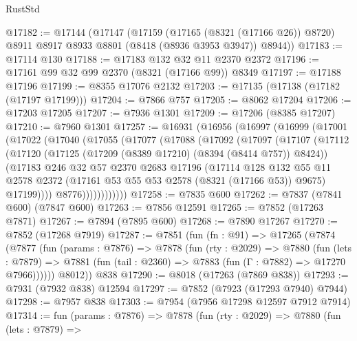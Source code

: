 \begin{lexlean}{RustStd}
\begin{coremodule}
@17182 := @17144
    (@17147
      (@17159
        (@17165 (@8321 (@17166 @26)) @8720)
        @8911
        @8917
        @8933
        @8801
        (@8418 (@8936 @3953 @3947))
        @8944))
@17183 := @17114 @130
@17188 := @17183 @132 @32 @11 @2370 @2372
@17196 := @17161 @99 @32 @99 @2370 (@8321 (@17166 @99)) @8349
@17197 := @17188 @17196
@17199 := @8355 @17076 @2132
@17203 := @17135 (@17138 (@17182 (@17197 @17199)))
@17204 := @7866 @757
@17205 := @8062 @17204
@17206 := @17203 @17205
@17207 := @7936 @1301
@17209 := @17206 (@8385 @17207)
@17210 := @7960 @1301
@17257 := @16931
    (@16956
      (@16997
        (@16999
          (@17001
            (@17022
              (@17040
                (@17055
                  (@17077
                    (@17088
                      (@17092
                        (@17097
                          (@17107
                            (@17112
                              (@17120
                                (@17125 (@17209 (@8389 @17210) (@8394 (@8414 @757)) @8424))
                                (@17183
                                  @246
                                  @32
                                  @57
                                  @2370
                                  @2683
                                  @17196
                                  (@17114
                                    @128
                                    @132
                                    @55
                                    @11
                                    @2578
                                    @2372
                                    (@17161 @53 @55 @53 @2578 (@8321 (@17166 @53)) @9675)
                                    @17199))))
                            @8776))))))))))))
@17258 := @7835 @600
@17262 := @7837 (@7841 @600) (@7847 @600)
@17263 := @7856 @12591
@17265 := @7852 (@17263 @7871)
@17267 := @7894 (@7895 @600)
@17268 := @7890 @17267
@17270 := @7852 (@17268 @7919)
@17287 := @7851
    (fun (fn : @91) =>
    @17265
      (@7874
        (@7877
          (fun (params : @7876) =>
          @7878
            (fun (rty : @2029) =>
            @7880
              (fun (lets : @7879) =>
              @7881 (fun (tail : @2360) => @7883 (fun (Γ : @7882) => @17270 @7966))))))
        @8012))
    @838
@17290 := @8018 (@17263 (@7869 @838))
@17293 := @7931 (@7932 @838) @12594
@17297 := @7852 (@7923 (@17293 @7940) @7944)
@17298 := @7957 @838
@17303 := @7954 (@7956 @17298 @12597 @7912 @7914)
@17314 := fun (params : @7876) =>
  @7878
    (fun (rty : @2029) =>
    @7880
      (fun (lets : @7879) =>

\end{coremodule}
\end{lexlean}
